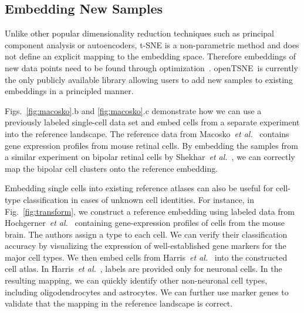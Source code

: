 \documentclass[letter]{article}
\newcommand{\opentsne}{\textsf{openTSNE}}
\begin{document}
\subsection*{Embedding New Samples}

Unlike other popular dimensionality reduction techniques such as principal
component analysis or autoencoders, t-SNE is a non-parametric method and does
not define an explicit mapping to the embedding space. Therefore embeddings of
new data points need to be found through
optimization~\cite{policar2019embedding}. \opentsne\ is currently the only
publicly available library allowing users to add new samples to existing
embeddings in a principled manner.

Figs.~\ref{fig:macosko}.b and \ref{fig:macosko}.c demonstrate how we can use a
previously labeled single-cell data set and embed cells from a separate
experiment into the reference landscape. The reference data from
Macosko~\textit{et al.}~\cite{macosko2015highly} contains gene expression
profiles from mouse retinal cells. By embedding the samples from a similar
experiment on bipolar retinal cells by Shekhar~\textit{et
al.}~\cite{shekhar2016comprehensive}, we can correctly map the bipolar cell
clusters onto the reference embedding.

Embedding single cells into existing reference atlases can also be useful for
cell-type classification in cases of unknown cell identities. For instance, in
Fig.~\ref{fig:transform}, we construct a reference embedding using labeled data
from Hochgerner~\textit{et al.}~\cite{hochgerner2018conserved} containing
gene-expression profiles of cells from the mouse brain. The authors assign a
type to each cell. We can verify their classification accuracy by visualizing
the expression of well-established gene markers for the major cell types. We
then embed cells from Harris~\textit{et al.}~\cite{harris2018classes} into the
constructed cell atlas. In Harris~\textit{et al.}~, labels are provided only for
neuronal cells. In the resulting mapping, we can quickly identify other
non-neuronal cell types, including oligodendrocytes and astrocytes. We can
further use marker genes to validate that the mapping in the reference landscape
is correct. 
\end{document}
